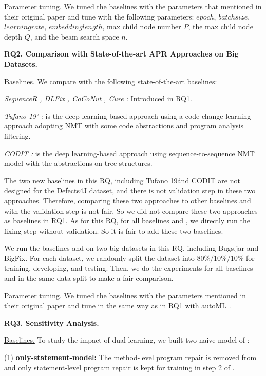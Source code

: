 \underline{Parameter tuning.} We tuned the baselines with the parameters that mentioned in their original paper and tune \tool with the following parameters: $epoch$, $batch size$, $learning rate$, $embedding length$, max child node number $P$, the max child node depth $Q$, and the beam search space $n$. {\color{blue}{I will add the final parameters when the experiments are all finished}}

{\bf RQ2. Comparison with State-of-the-art APR Approaches on Big Datasets.}

\underline{Baselines.} We compare {\tool} with the following state-of-the-art baselines:

{\it SequenceR \cite{chen2018sequencer}, DLFix \cite{li2020dlfix}, CoCoNut \cite{lutellier2020coconut}, Cure \cite{cure-icse21}: } Introduced in RQ1.

{\it Tufano 19’ \cite{tufano2019learning}: } is the deep learning-based approach using a code change learning approach adopting NMT with some code abstractions and program analysis filtering.

{\it CODIT \cite{chakrabortycodit}: } is the deep learning-based approach using sequence-to-sequence NMT model with the abstractions on tree structures.

The two new baselines in this RQ, including Tufano 19\' and CODIT are not designed for the Defects4J dataset, and there is not validation step in these two approaches. Therefore, comparing these two approaches to other baselines and \tool with the validation step is not fair. So we did not compare these two approaches as baselines in RQ1. As for this RQ, for all baselines and \tool, we directly run the fixing step without validation. So it is fair to add these two baselines.

We run the baselines and \tool on two big datasets in this RQ, including Bugs.jar and BigFix. For each dataset, we randomly split the dataset into 80\%/10\%/10\% for training, developing, and testing. Then, we do the experiments for all baselines and \tool in the same data split to make a fair comparison.

\underline{Parameter tuning.} We tuned the baselines with the parameters mentioned in their original paper and tune \tool in the same way as in RQ1 with autoML \cite{NNI}.

{\bf RQ3. Sensitivity Analysis.}

\underline{Baselines.} To study the impact of dual-learning, we built two naive model of {\tool}: 

(1) \textbf{only-statement-model:} The method-level program repair is removed from {\tool} and only statement-level program repair is kept for training in step 2 of \tool.

